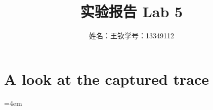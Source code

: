 \documentclass[a4paper]{article}
\begin{document}
\title{实验报告 Lab 5}
\author{姓名：王钦\quad 学号：13349112}
\date{}
\maketitle

\section*{ A look at the captured trace}
\hangindent=4em 
\end{document}
